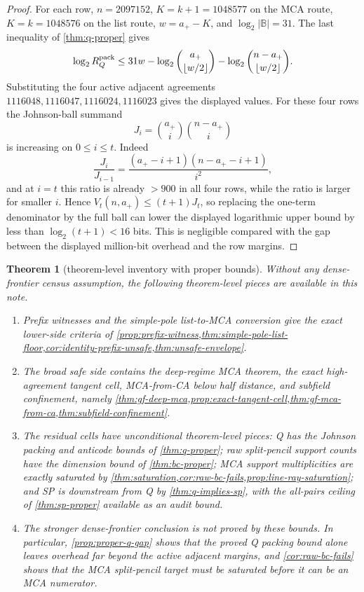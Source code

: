 \documentclass[a4paper,11pt]{amsart}
\newtheorem{theorem}{Theorem}[section]
\theoremstyle{remark}
\newcommand{\B}{\mathbb B}
\begin{document}
\begin{proof}
For each row, \(n=2097152\), \(K=k+1=1048577\) on the MCA route, \(K=k=1048576\) on the list route, \(w=a_+-K\), and \(\log_2|\B|=31\).  The last inequality of \cref{thm:q-proper} gives
\[
        \log_2 R_Q^{\rm pack}
        \le
        31w-\log_2\binom{a_+}{\lfloor w/2\rfloor}
             -\log_2\binom{n-a_+}{\lfloor w/2\rfloor}.
\]
Substituting the four active adjacent agreements \(1116048,1116047,1116024,1116023\) gives the displayed values.  For these four rows the Johnson-ball summand
\[
        J_i=\binom{a_+}{i}\binom{n-a_+}{i}
\]
is increasing on \(0\le i\le t\).  Indeed
\[
        \frac{J_i}{J_{i-1}}
        =
        \frac{(a_+-i+1)(n-a_+-i+1)}{i^2},
\]
and at \(i=t\) this ratio is already \(>900\) in all four rows, while the ratio is larger for smaller \(i\).  Hence \(V_t(n,a_+)\le(t+1)J_t\), so replacing the one-term denominator by the full ball can lower the displayed logarithmic upper bound by less than \(\log_2(t+1)<16\) bits.  This is negligible compared with the gap between the displayed million-bit overhead and the row margins.
\end{proof}

\begin{theorem}[theorem-level inventory with proper bounds]\label{thm:proper-inventory}
Without any dense-frontier census assumption, the following theorem-level pieces are available in this note.
\begin{enumerate}[label=\textup{(\roman*)}]
\item Prefix witnesses and the simple-pole list-to-MCA conversion give the exact lower-side criteria of \cref{prop:prefix-witness,thm:simple-pole-list-floor,cor:identity-prefix-unsafe,thm:unsafe-envelope}.
\item The broad safe side contains the deep-regime MCA theorem, the exact high-agreement tangent cell, MCA-from-CA below half distance, and subfield confinement, namely \cref{thm:gf-deep-mca,prop:exact-tangent-cell,thm:gf-mca-from-ca,thm:subfield-confinement}.
\item The residual cells have unconditional theorem-level pieces: Q has the Johnson packing and anticode bounds of \cref{thm:q-proper}; raw split-pencil support counts have the dimension bound of \cref{thm:bc-proper}; MCA support multiplicities are exactly saturated by \cref{thm:saturation,cor:raw-bc-fails,prop:line-ray-saturation}; and SP is downstream from Q by \cref{thm:q-implies-sp}, with the all-pairs ceiling of \cref{thm:sp-proper} available as an audit bound.
\item The stronger dense-frontier conclusion is not proved by these bounds.  In particular, \cref{prop:proper-q-gap} shows that the proved Q packing bound alone leaves overhead far beyond the active adjacent margins, and \cref{cor:raw-bc-fails} shows that the MCA split-pencil target must be saturated before it can be an MCA numerator.
\end{enumerate}
\end{theorem}
\end{document}
